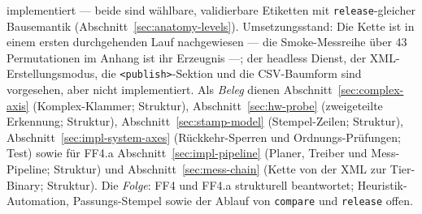 \begin{nurlang}
implementiert --- beide sind wählbare, validierbare Etiketten mit \texttt{release}-gleicher Bausemantik
(Abschnitt~\ref{sec:anatomy-levels}).
Umsetzungsstand: Die Kette ist in einem ersten durchgehenden Lauf nachgewiesen --- die Smoke-Messreihe über 43
Permutationen im Anhang ist ihr Erzeugnis ---; der headless Dienst, der XML-Erstellungsmodus, die
\texttt{<publish>}-Sektion und die CSV-Baumform sind vorgesehen, aber nicht implementiert. Als \emph{Beleg} dienen
Abschnitt~\ref{sec:complex-axis} (Komplex-Klammer; Struktur), Abschnitt~\ref{sec:hw-probe}
(zweigeteilte Erkennung; Struktur), Abschnitt~\ref{sec:stamp-model} (Stempel-Zeilen; Struktur),
Abschnitt~\ref{sec:impl-system-axes} (Rückkehr-Sperren und Ordnungs-Prüfungen; Test) sowie für FF4.a
Abschnitt~\ref{sec:impl-pipeline} (Planer, Treiber und Mess-Pipeline; Struktur) und
Abschnitt~\ref{sec:mess-chain} (Kette von der XML zur Tier-Binary; Struktur). Die \emph{Folge}: FF4
und FF4.a strukturell beantwortet; Heuristik-Automation, Passungs-Stempel sowie der Ablauf von
\texttt{compare} und \texttt{release} offen.
\end{nurlang}
